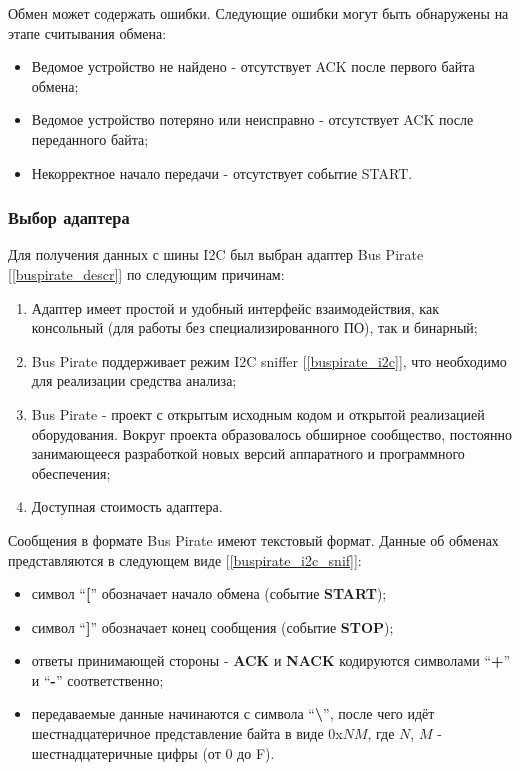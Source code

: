 Обмен может содержать ошибки. Следующие ошибки могут быть обнаружены на этапе считывания обмена:

\begin{itemize}
 \item Ведомое устройство не найдено - отсутствует ACK после первого байта обмена;
 \item Ведомое устройство потеряно или неисправно - отсутствует ACK после переданного байта;
 \item Некорректное начало передачи - отсутствует событие START.
\end{itemize}

\subsubsection{Выбор адаптера}

Для получения данных с шины I2C был выбран адаптер Bus Pirate [\ref{buspirate_descr}] по следующим причинам:

\begin{enumerate}
 \item Адаптер имеет простой и удобный интерфейс взаимодействия, как консольный (для работы без специализированного ПО), так и бинарный;
 \item Bus Pirate поддерживает режим I2C sniffer [\ref{buspirate_i2c}], что необходимо для реализации средства анализа;
 \item Bus Pirate - проект с открытым исходным кодом и открытой реализацией оборудования. Вокруг проекта образовалось обширное сообщество, постоянно занимающееся разработкой новых версий аппаратного и программного обеспечения;
 \item Доступная стоимость адаптера.
\end{enumerate}

Сообщения в формате Bus Pirate имеют текстовый формат. Данные об обменах представляются в следующем виде [\ref{buspirate_i2c_snif}]:

\begin{itemize}
 \item символ ``\textbf{[}'' обозначает начало обмена (событие \textbf{START});
 \item символ ``\textbf{]}'' обозначает конец сообщения (событие \textbf{STOP});
 \item ответы принимающей стороны - \textbf{ACK} и \textbf{NACK} кодируются символами ``\textbf{+}'' и ``\textbf{-}'' соответственно;
 \item передаваемые данные начинаются с символа ``\textbf{\textbackslash}'', после чего идёт шестнадцатеричное представление байта в виде 0x$NM$, где $N$, $M$ - шестнадцатеричные цифры (от 0 до F).
\end{itemize}

